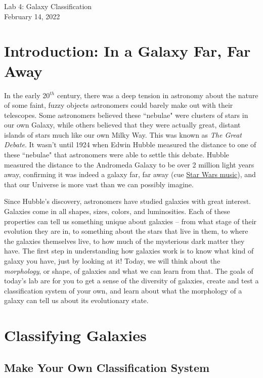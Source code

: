 \documentclass[11pt]{article}
\begin{document}
\begin{center}
\huge{Lab 4: Galaxy Classification}\\ \medskip \Large{February 14, 2022}
\end{center}

\section{Introduction: In a Galaxy Far, Far Away}
In the early 20$^{th}$ century, there was a deep tension in astronomy about the nature of some faint, fuzzy objects astronomers could barely make out with their telescopes. Some astronomers believed these ``nebulae" were clusters of stars in our own Galaxy, while others believed that they were actually great, distant islands of stars much like our own Milky Way.  This was known as \textit{The Great Debate}.  It wasn't until 1924 when Edwin Hubble measured the distance to one of these ``nebulae" that astronomers were able to settle this debate. Hubble measured the distance to the Andromeda Galaxy to be over 2 million light years away, confirming it was indeed a galaxy far, far away (cue \href{https://www.youtube.com/watch?v=MNMSAIG0dfQ}{Star Wars music}), and that our Universe is more vast than we can possibly imagine.

\medskip \noindent
Since Hubble's discovery, astronomers have studied galaxies with great interest. Galaxies come in all shapes, sizes, colors, and luminosities.  Each of these properties can tell us something unique about galaxies -- from what stage of their evolution they are in, to something about the stars that live in them, to where the galaxies themselves live, to how much of the mysterious dark matter they have.  The first step in understanding how galaxies work is to know what kind of galaxy you have, just by looking at it!  Today, we will think about the \textit{morphology}, or shape, of galaxies and what we can learn from that.  The goals of today's lab are for you to get a sense of the diversity of galaxies, create and test a classification system of your own, and learn about what the morphology of a galaxy can tell us about its evolutionary state.

\section{Classifying Galaxies}
\subsection{Make Your Own Classification System}
\end{document}
